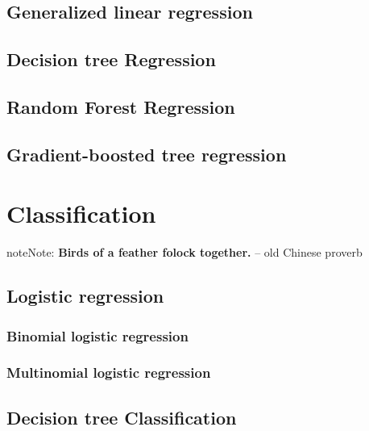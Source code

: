 \documentclass[letterpaper,11pt,english]{sphinxmanual}
\begin{document}
\section{Generalized linear regression}
\label{regression:generalized-linear-regression}

\section{Decision tree Regression}
\label{regression:decision-tree-regression}

\section{Random Forest Regression}
\label{regression:random-forest-regression}

\section{Gradient-boosted tree regression}
\label{regression:gradient-boosted-tree-regression}

\chapter{Classification}
\label{classification:yassine-alouini}\label{classification::doc}\label{classification:classification}\label{classification:id1}
\begin{notice}{note}{Note:}
\textbf{Birds of a feather folock together.} -- old Chinese proverb
\end{notice}


\section{Logistic regression}
\label{classification:logistic-regression}

\subsection{Binomial logistic regression}
\label{classification:binomial-logistic-regression}

\subsection{Multinomial logistic regression}
\label{classification:multinomial-logistic-regression}

\section{Decision tree Classification}
\label{classification:decision-tree-classification}
\end{document}
